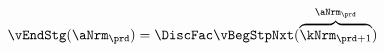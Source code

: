   \begin{equation}\begin{gathered}\begin{aligned}
        \vEndStg(\aNrm_{\prd}) & = \DiscFac \vBegStpNxt(\overbrace{\kNrm_{\prd+1}}^{\aNrm_{\prd}}) \label{eq:vEndtdefn}
      \end{aligned}\end{gathered}\end{equation}
